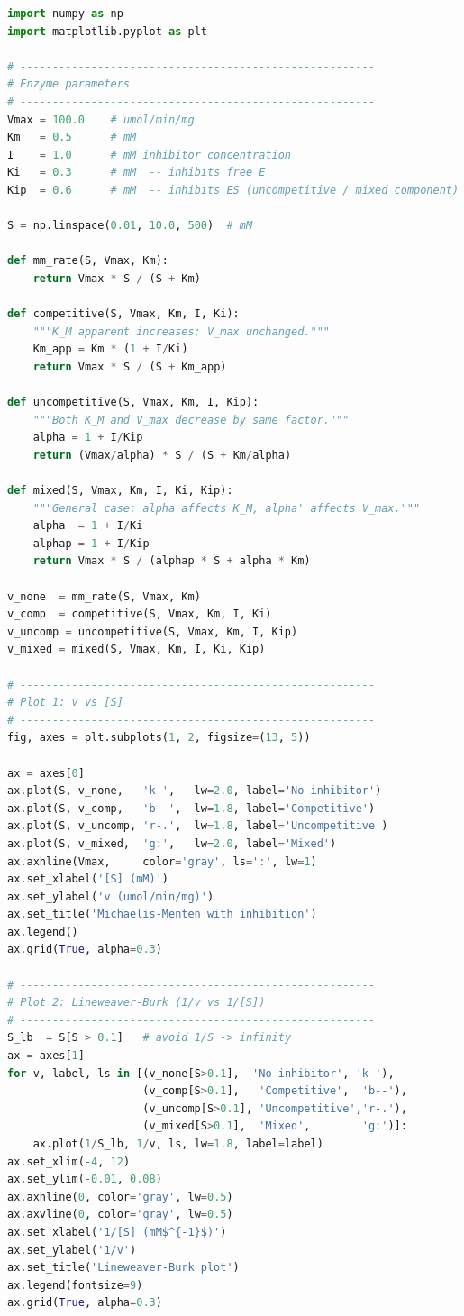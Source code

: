 \documentclass[12pt, a4paper, oneside]{report}
\begin{document}
\begin{lstlisting}[language=Python,
  caption={Enzyme kinetics simulation (Python 3, NumPy, Matplotlib).},
  label={lst:enzkinetics}]
import numpy as np
import matplotlib.pyplot as plt

# -------------------------------------------------------
# Enzyme parameters
# -------------------------------------------------------
Vmax = 100.0    # umol/min/mg
Km   = 0.5      # mM
I    = 1.0      # mM inhibitor concentration
Ki   = 0.3      # mM  -- inhibits free E
Kip  = 0.6      # mM  -- inhibits ES (uncompetitive / mixed component)

S = np.linspace(0.01, 10.0, 500)  # mM

def mm_rate(S, Vmax, Km):
    return Vmax * S / (S + Km)

def competitive(S, Vmax, Km, I, Ki):
    """K_M apparent increases; V_max unchanged."""
    Km_app = Km * (1 + I/Ki)
    return Vmax * S / (S + Km_app)

def uncompetitive(S, Vmax, Km, I, Kip):
    """Both K_M and V_max decrease by same factor."""
    alpha = 1 + I/Kip
    return (Vmax/alpha) * S / (S + Km/alpha)

def mixed(S, Vmax, Km, I, Ki, Kip):
    """General case: alpha affects K_M, alpha' affects V_max."""
    alpha  = 1 + I/Ki
    alphap = 1 + I/Kip
    return Vmax * S / (alphap * S + alpha * Km)

v_none  = mm_rate(S, Vmax, Km)
v_comp  = competitive(S, Vmax, Km, I, Ki)
v_uncomp = uncompetitive(S, Vmax, Km, I, Kip)
v_mixed = mixed(S, Vmax, Km, I, Ki, Kip)

# -------------------------------------------------------
# Plot 1: v vs [S]
# -------------------------------------------------------
fig, axes = plt.subplots(1, 2, figsize=(13, 5))

ax = axes[0]
ax.plot(S, v_none,   'k-',   lw=2.0, label='No inhibitor')
ax.plot(S, v_comp,   'b--',  lw=1.8, label='Competitive')
ax.plot(S, v_uncomp, 'r-.',  lw=1.8, label='Uncompetitive')
ax.plot(S, v_mixed,  'g:',   lw=2.0, label='Mixed')
ax.axhline(Vmax,     color='gray', ls=':', lw=1)
ax.set_xlabel('[S] (mM)')
ax.set_ylabel('v (umol/min/mg)')
ax.set_title('Michaelis-Menten with inhibition')
ax.legend()
ax.grid(True, alpha=0.3)

# -------------------------------------------------------
# Plot 2: Lineweaver-Burk (1/v vs 1/[S])
# -------------------------------------------------------
S_lb  = S[S > 0.1]   # avoid 1/S -> infinity
ax = axes[1]
for v, label, ls in [(v_none[S>0.1],  'No inhibitor', 'k-'),
                     (v_comp[S>0.1],   'Competitive',  'b--'),
                     (v_uncomp[S>0.1], 'Uncompetitive','r-.'),
                     (v_mixed[S>0.1],  'Mixed',        'g:')]:
    ax.plot(1/S_lb, 1/v, ls, lw=1.8, label=label)
ax.set_xlim(-4, 12)
ax.set_ylim(-0.01, 0.08)
ax.axhline(0, color='gray', lw=0.5)
ax.axvline(0, color='gray', lw=0.5)
ax.set_xlabel('1/[S] (mM$^{-1}$)')
ax.set_ylabel('1/v')
ax.set_title('Lineweaver-Burk plot')
ax.legend(fontsize=9)
ax.grid(True, alpha=0.3)


\end{lstlisting}
\end{document}
